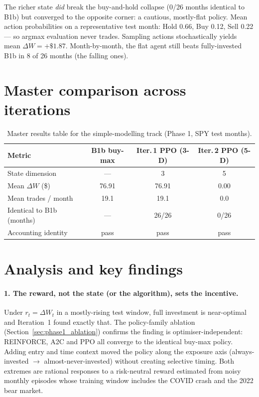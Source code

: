 The richer state \emph{did} break the buy-and-hold collapse (0/26 months identical to B1b) but converged to the opposite corner: a cautious, mostly-flat policy. Mean action probabilities on a representative test month: Hold 0.66, Buy 0.12, Sell 0.22 --- so argmax evaluation never trades. Sampling actions stochastically yields mean $\Delta W = +\$1.87$. Month-by-month, the flat agent still beats fully-invested B1b in 8 of 26 months (the falling ones).

\section{Master comparison across iterations}
\label{sec:master_table}

\begin{table}[h]
\centering
\caption{Master results table for the simple-modelling track (Phase 1, SPY test months).}
\label{tab:master}
\begin{tabular}{lccc}
\toprule
\textbf{Metric} & \textbf{B1b buy-max} & \textbf{Iter.\,1 PPO (3-D)} & \textbf{Iter.\,2 PPO (5-D)} \\
\midrule
State dimension              & ---     & 3       & 5 \\
Mean $\Delta W$ (\$)         & 76.91   & 76.91   & 0.00 \\
Mean trades / month          & 19.1    & 19.1    & 0.0 \\
Identical to B1b (months)    & ---     & 26/26   & 0/26 \\
Accounting identity          & pass    & pass    & pass \\
\bottomrule
\end{tabular}
\end{table}

\section{Analysis and key findings}
\label{sec:analysis_simple}

\paragraph{1. The reward, not the state (or the algorithm), sets the incentive.} Under $r_t=\Delta W_t$ in a mostly-rising test window, full investment is near-optimal and Iteration~1 found exactly that. The policy-family ablation (Section~\ref{sec:phase1_ablation}) confirms the finding is optimiser-independent: REINFORCE, A2C and PPO all converge to the identical buy-max policy. Adding entry and time context moved the policy along the exposure axis (always-invested $\to$ almost-never-invested) without creating selective timing. Both extremes are rational responses to a risk-neutral reward estimated from noisy monthly episodes whose training window includes the COVID crash and the 2022 bear market.

